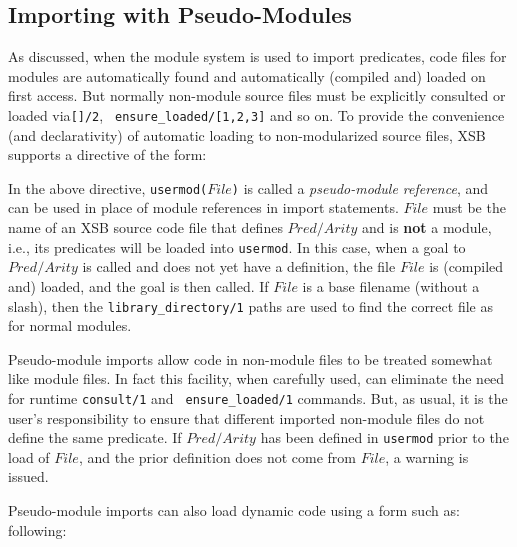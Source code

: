 \subsection{Importing with Pseudo-Modules}

As discussed, when the module system is used to import predicates,
code files for modules are automatically found and automatically
(compiled and) loaded on first access.  But normally non-module source
files must be explicitly consulted or loaded via{\tt []/2}, {\tt
  ensure\_loaded/[1,2,3]} and so on.  To provide the convenience (and
declarativity) of automatic loading to non-modularized source files,
XSB supports a directive of the form:


\noindent 
In the above directive, {\tt usermod($File$)} is called a {\em
  pseudo-module reference}, and can be used in place of module
references in import statements.  $File$ must be the name of an XSB
source code file that defines $Pred/Arity$ and is {\bf not} a module,
i.e., its predicates will be loaded into {\tt usermod}.  In this case,
when a goal to $Pred/Arity$ is called and does not yet have a
definition, the file $File$ is (compiled and) loaded, and the goal is
then called.  If $File$ is a base filename (without a slash), then the
{\tt library\_directory/1} paths are used to find the correct file as
for normal modules.


Pseudo-module imports allow code in non-module files to be treated
somewhat like module files.  In fact this facility, when carefully
used, can eliminate the need for runtime {\tt consult/1} and {\tt
  ensure\_loaded/1} commands.  But, as usual, it is the user's
responsibility to ensure that different imported non-module files do
not define the same predicate.  If $Pred/Arity$ has been defined in
{\tt usermod} prior to the load of $File$, and the prior definition
does not come from $File$, a warning is issued.

Pseudo-module imports can also load dynamic code using a form such as:
following:


